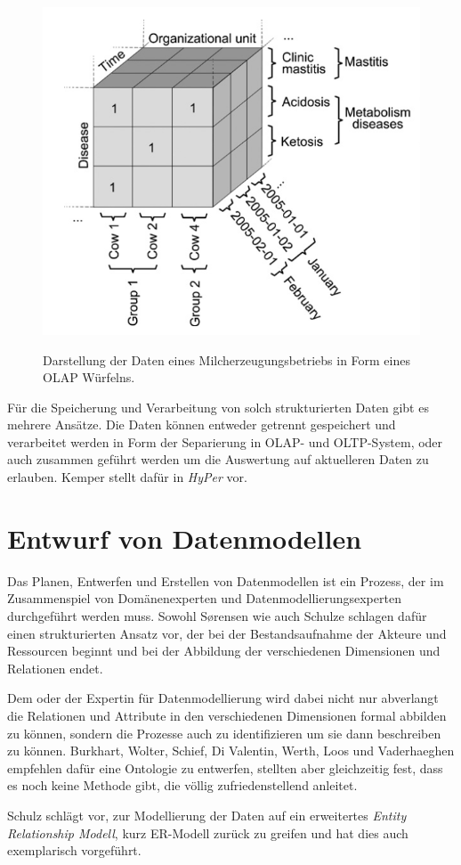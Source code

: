 \begin{figure}[h]
 \includegraphics[scale=0.5,natwidth=\textwidth]{figures/datamodelling/kuehe_olap_wuerfel_schulze2007.png}
 \centering
 \label{fig:kuehe_olap}
 \caption{Darstellung der Daten eines Milcherzeugungsbetriebs in Form eines OLAP Würfelns.\cite{jour:Schulze2007}}
\end{figure}

Für die Speicherung und Verarbeitung von solch strukturierten Daten gibt es mehrere Ansätze. Die Daten können entweder getrennt gespeichert und verarbeitet werden in Form der Separierung in OLAP- und OLTP-System, oder auch zusammen geführt werden um die Auswertung auf aktuelleren Daten zu erlauben. Kemper stellt dafür in \cite{jour:Kemper2011} \textit{HyPer} vor.

\section{Entwurf von Datenmodellen}
Das Planen, Entwerfen und Erstellen von Datenmodellen ist ein Prozess, der im Zusammenspiel von Domänenexperten und Datenmodellierungsexperten durchgeführt werden muss. Sowohl S\o rensen wie auch Schulze schlagen dafür einen strukturierten Ansatz vor, der bei der Bestandsaufnahme der Akteure und Ressourcen beginnt und bei der Abbildung der verschiedenen Dimensionen und Relationen endet.\cite{jour:Schulze2007}\cite{jour:Sorensen2010}

Dem oder der Expertin für Datenmodellierung wird dabei nicht nur abverlangt die Relationen und Attribute in den verschiedenen Dimensionen formal abbilden zu können, sondern die Prozesse auch zu identifizieren um sie dann beschreiben zu können. Burkhart, Wolter, Schief, Di Valentin, Werth, Loos und Vaderhaeghen empfehlen dafür eine Ontologie zu entwerfen, stellten aber gleichzeitig fest, dass es noch keine Methode gibt, die völlig zufriedenstellend anleitet.\cite{jour:Burkhart2012} 

Schulz schlägt vor, zur Modellierung der Daten auf ein erweitertes \textit{Entity Relationship Modell}, kurz ER-Modell zurück zu greifen und hat dies auch exemplarisch vorgeführt. 


